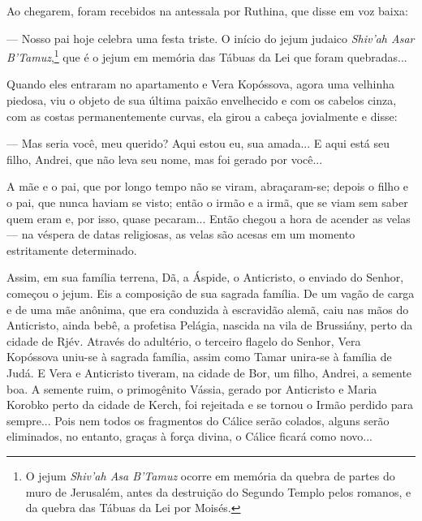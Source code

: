 Ao chegarem, foram recebidos na antessala por Ruthina, que disse em voz
baixa:

--- Nosso pai hoje celebra uma festa triste. O início do jejum judaico
\emph{Shiv'ah Asar B'Tamuz},\footnote{O jejum \emph{Shiv'ah Asa B'Tamuz}
  ocorre em memória da quebra de partes do muro de Jerusalém, antes da
  destruição do Segundo Templo pelos romanos, e da quebra das Tábuas da
  Lei por Moisés.} que é o jejum em memória das Tábuas da Lei que foram
quebradas...

Quando eles entraram no apartamento e Vera Kopóssova, agora uma velhinha
piedosa, viu o objeto de sua última paixão envelhecido e com os cabelos
cinza, com as costas permanentemente curvas, ela girou a cabeça
jovialmente e disse:

--- Mas seria você, meu querido? Aqui estou eu, sua amada... E aqui está
seu filho, Andrei, que não leva seu nome, mas foi gerado por você...

A mãe e o pai, que por longo tempo não se viram, abraçaram-se; depois o
filho e o pai, que nunca haviam se visto; então o irmão e a irmã, que se
viam sem saber quem eram e, por isso, quase pecaram... Então chegou a
hora de acender as velas --- na véspera de datas religiosas, as velas
são acesas em um momento estritamente determinado.

Assim, em sua família terrena, Dã, a Áspide, o Anticristo, o enviado do
Senhor, começou o jejum. Eis a composição de sua sagrada família. De um
vagão de carga e de uma mãe anônima, que era conduzida à escravidão
alemã, caiu nas mãos do Anticristo, ainda bebê, a profetisa Pelágia,
nascida na vila de Brussiány, perto da cidade de Rjév. Através do
adultério, o terceiro flagelo do Senhor, Vera Kopóssova uniu-se à
sagrada família, assim como Tamar unira-se à família de Judá. E Vera e
Anticristo tiveram, na cidade de Bor, um filho, Andrei, a semente boa. A
semente ruim, o primogênito Vássia, gerado por Anticristo e Maria
Korobko perto da cidade de Kerch, foi rejeitada e se tornou o Irmão
perdido para sempre... Pois nem todos os fragmentos do Cálice serão
colados, alguns serão eliminados, no entanto, graças à força divina, o
Cálice ficará como novo...

